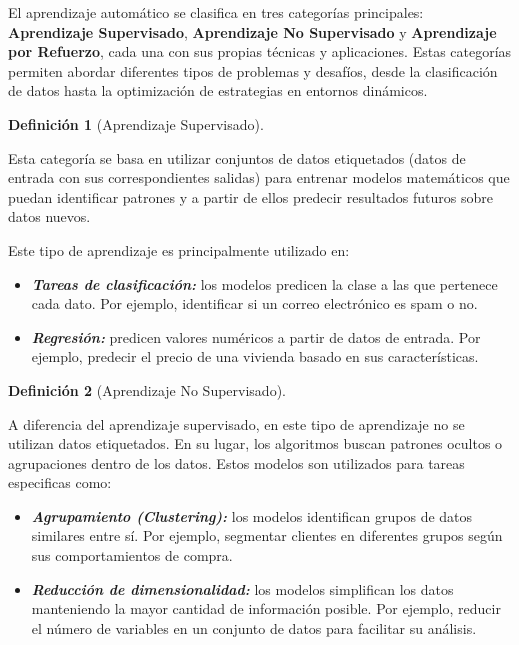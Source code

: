 \documentclass[
  spanish,
  letterpaper,
]{scrreprt}
\providecommand{\tightlist}{%
  \setlength{\itemsep}{0pt}\setlength{\parskip}{0pt}}
\theoremstyle{definition}
\newtheorem{definition}{Definición}[chapter]
\theoremstyle{remark}
\begin{document}
El aprendizaje automático se clasifica en tres categorías principales:
\textbf{Aprendizaje Supervisado}, \textbf{Aprendizaje No Supervisado} y
\textbf{Aprendizaje por Refuerzo}, cada una con sus propias técnicas y
aplicaciones. Estas categorías permiten abordar diferentes tipos de
problemas y desafíos, desde la clasificación de datos hasta la
optimización de estrategias en entornos dinámicos.

\begin{definition}[Aprendizaje
Supervisado]\protect\hypertarget{def-sub}{}\label{def-sub}

Esta categoría se basa en utilizar conjuntos de datos etiquetados (datos
de entrada con sus correspondientes salidas) para entrenar modelos
matemáticos que puedan identificar patrones y a partir de ellos predecir
resultados futuros sobre datos nuevos.

Este tipo de aprendizaje es principalmente utilizado en:

\begin{itemize}
\tightlist
\item
  \textbf{\emph{Tareas de clasificación:}} los modelos predicen la clase
  a las que pertenece cada dato. Por ejemplo, identificar si un correo
  electrónico es spam o no.
\item
  \textbf{\emph{Regresión:}} predicen valores numéricos a partir de
  datos de entrada. Por ejemplo, predecir el precio de una vivienda
  basado en sus características.
\end{itemize}

\end{definition}

\begin{definition}[Aprendizaje No
Supervisado]\protect\hypertarget{def-sub}{}\label{def-sub}

A diferencia del aprendizaje supervisado, en este tipo de aprendizaje no
se utilizan datos etiquetados. En su lugar, los algoritmos buscan
patrones ocultos o agrupaciones dentro de los datos. Estos modelos son
utilizados para tareas especificas como:

\begin{itemize}
\tightlist
\item
  \textbf{\emph{Agrupamiento (Clustering):}} los modelos identifican
  grupos de datos similares entre sí. Por ejemplo, segmentar clientes en
  diferentes grupos según sus comportamientos de compra.
\item
  \textbf{\emph{Reducción de dimensionalidad:}} los modelos simplifican
  los datos manteniendo la mayor cantidad de información posible. Por
  ejemplo, reducir el número de variables en un conjunto de datos para
  facilitar su análisis.
\end{itemize}

\end{definition}
\end{document}
